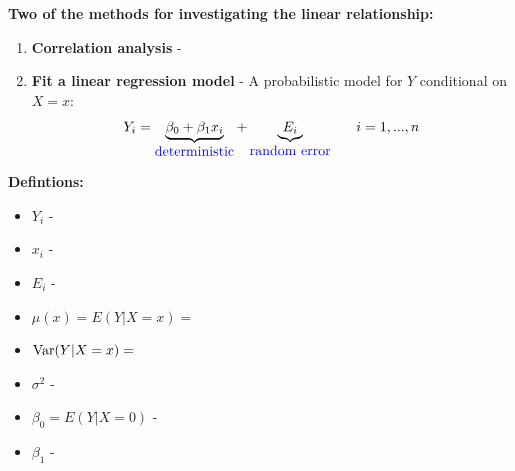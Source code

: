 \textbf{Two of the methods for investigating the linear relationship:}
\begin{enumerate}
\item \textbf{Correlation analysis} -  	\\
	
\newpage

\item \textbf{Fit a linear regression model} - A probabilistic model for $Y$ conditional on $X=x$:
		$$ Y_i = \underbrace{\beta_0 + \beta_1 x_i}_{\mbox{\textcolor{blue}{deterministic}}} + \underbrace{E_i}_{\mbox{\textcolor{blue}{random error}}}~~~~~i=1,...,n$$
\end{enumerate}
\textbf{Defintions:}
\begin{itemize}
\item $Y_i$ - \\
\item $x_i$ - \\
\item $E_i$ - \\
\item $\mu(x)=E(Y|X=x)=$\\
\item $\mbox{Var}(Y|X=x)=$ \\
\item $\sigma^2$ - \\
\item $\beta_0=E(Y|X=0)$ - \\
\item $\beta_1$ - \\~\\
\end{itemize}

